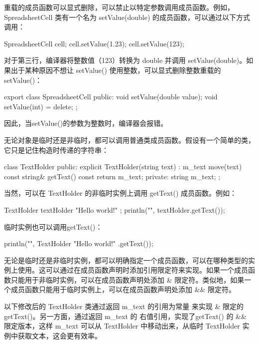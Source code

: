 
重载的成员函数可以显式删除，可以禁止以特定参数调用成员函数。例如，SpreadsheetCell 类有一个名为 setValue(double) 的成员函数，可以通过以下方式调用：

\begin{cpp}
SpreadsheetCell cell;
cell.setValue(1.23);
cell.setValue(123);
\end{cpp}

对于第三行，编译器将整数值（123）转换为 double 并调用 setValue(double)。如果出于某种原因不想让 setValue() 使用整数，可以显式删除整数重载的 setValue()：

\begin{cpp}
export class SpreadsheetCell
{
    public:
        void setValue(double value);
        void setValue(int) = delete;
};
\end{cpp}

因此，当setValue()的参数为整数时，编译器会报错。


无论对象是临时还是非临时，都可以调用普通类成员函数。假设有一个简单的类，它只是记住构造时传递的字符串：

\begin{cpp}
class TextHolder
{
    public:
        explicit TextHolder(string text) : m_text { move(text) } {}
        const string& getText() const { return m_text; }
    private:
        string m_text;
};
\end{cpp}

当然，可以在 TextHolder 的非临时实例上调用 getText() 成员函数。例如：

\begin{cpp}
TextHolder textHolder { "Hello world!" };
println("{}", textHolder.getText());
\end{cpp}

临时实例也可以调用getText()：

\begin{cpp}
println("{}", TextHolder{ "Hello world!" }.getText());
\end{cpp}

无论是临时还是非临时实例，都可以明确指定一个成员函数，可以在哪种类型的实例上使用。这可以通过在成员函数声明时添加引用限定符来实现。如果一个成员函数只能用于非临时实例，可以在成员函数声明处添加 \& 限定符。类似地，如果一个成员函数只能用于临时实例上，可以在成员函数声明处添加 \&\& 限定符。

以下修改后的 TextHolder 类通过返回 m\_text 的引用为常量 来实现 \& 限定的 getText()。另一方面，通过返回 m\_text 的 右值引用，实现了getText() 的 \&\& 限定版本，这样 m\_text 可以从 TextHolder 中移动出来，从临时 TextHolder 实例中获取文本，这会更有效率。

